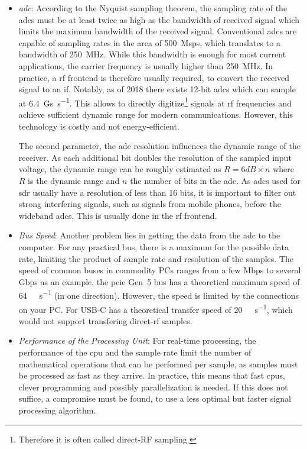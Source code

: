 \begin{itemize}
 \item \textit{\Acrlong{adc}}: According to the Nyquist sampling theorem, the sampling rate of the \glspl{adc}  must be at least twice as high as the bandwidth of received signal which limits the maximum bandwidth of the received signal. Conventional \glspl{adc} are capable of sampling rates in the area of \SI{500}{Msps}, which translates to a bandwidth of \SI{250}{\mega\hertz}. While this bandwidth is enough for most current applications, the carrier frequency is usually higher than \SI{250}{\mega\hertz}. In practice, a \gls{rf} frontend is therefore usually required, to convert the received signal to an \gls{if}. Notably, as of 2018 there exists 12-bit \glspl{adc} which can sample at \SI{6.4}{\giga s\per\second}. This allows to directly digitize\footnote{Therefore it is often called direct-RF sampling.} signals at \gls{rf} frequencies and achieve sufficient dynamic range for modern communications. However, this technology is costly and not energy-efficient.
 
The second parameter, the \gls{adc} resolution influences the dynamic range of the receiver. As each additional bit doubles the resolution of the sampled input voltage, the dynamic range can be roughly estimated as $R = 6dB \times n$ where $R$ is the dynamic range and $n$ the number of bits in the \gls{adc}. As \glspl{adc} used for \gls{sdr} usually have a resolution of less than 16 bits, it is important to filter out strong interfering signals, such as signals from mobile phones, before the wideband \glspl{adc}. This is usually done in the \gls{rf} frontend. 

\item \textit{Bus Speed}: Another problem lies in getting the data from the \gls{adc} to the computer. For any practical bus, there is a maximum for the possible data rate, limiting the product of sample rate and resolution of the samples. The speed of common buses in commodity PCs ranges from a few Mbps to several Gbps as an example, the \gls{pcie} Gen~5 bus has a theoretical maximum speed of \SI{64}{\giga\byte\per\second} (in one direction). However, the speed is limited by the connections on your PC. For USB-C has a theoretical transfer speed of \SI{20}{\giga\bit\per\second}, which would not support transfering direct-\gls{rf} samples. 

\item \textit{Performance of the Processing Unit}: For real-time processing, the performance of the \gls{cpu} and the sample rate limit the number of mathematical operations that can be performed per sample, as samples must be processed as fast as they arrive. In practice, this means that fast \glspl{cpu}, clever programming and possibly parallelization is needed. If this does not suffice, a compromise must be found, to use a less optimal but faster signal processing algorithm.


\end{itemize}
